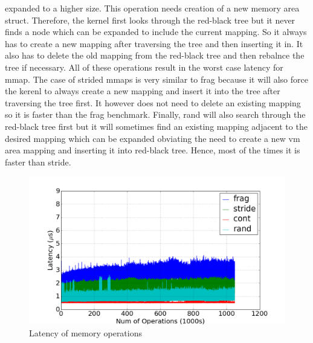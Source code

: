 \documentclass[twocolumn,11pt]{article}
\begin{document}
expanded to a higher size. This operation needs creation of a new memory area
struct. Therefore, the kernel first looks through the red-black tree but it
never finds a node which can be expanded to include the current mapping. So it
always has to create a new mapping after traversing the tree and then inserting
it in. It also has to delete the old mapping from the red-black tree and then
rebalnce the tree if necessary. All of these operations result in the worst case
latency for mmap.  The case of strided mmaps is very similar to frag because it
will also force the kerenl to always create a new mapping and insert it into the
tree after traversing the tree first. It however does not need to delete an
existing mapping so it is faster than the frag benchmark. Finally, rand will
also search through the red-black tree first but it will sometimes find an
existing mapping adjacent to the desired mapping which can be expanded obviating
the need to create a new vm area mapping and inserting it into red-black tree.
Hence, most of the times it is faster than stride.

\begin{figure}
    \includegraphics[width=\columnwidth]{figures/mmap_latency}
    \caption{Latency of memory operations}
    \label{fig:mmap_latency}
\end{figure}
\end{document}
